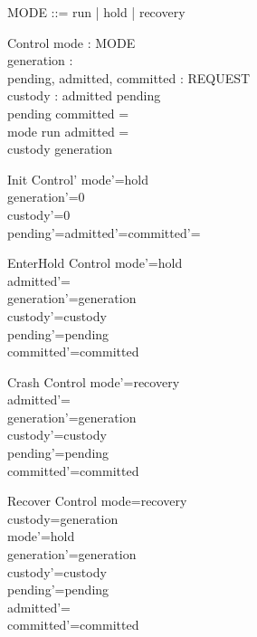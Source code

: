 \documentclass{article}
\begin{document}
\begin{zed}
MODE ::= run | hold | recovery\\
[REQUEST]
\end{zed}
\begin{schema}{Control}
mode : MODE\\
generation : \nat\\
pending, admitted, committed : \power REQUEST\\
custody : \nat
\where
admitted \subseteq pending\\
pending \cap committed = \emptyset\\
mode \neq run \implies admitted = \emptyset\\
custody \leq generation
\end{schema}
\begin{schema}{Init}
Control'
\where
mode'=hold\\
generation'=0\\
custody'=0\\
pending'=admitted'=committed'=\emptyset
\end{schema}
\begin{schema}{EnterHold}
\Delta Control
\where
mode'=hold\\
admitted'=\emptyset\\
generation'=generation\\
custody'=custody\\
pending'=pending\\
committed'=committed
\end{schema}
\begin{schema}{Crash}
\Delta Control
\where
mode'=recovery\\
admitted'=\emptyset\\
generation'=generation\\
custody'=custody\\
pending'=pending\\
committed'=committed
\end{schema}
\begin{schema}{Recover}
\Delta Control
\where
mode=recovery\\
custody=generation\\
mode'=hold\\
generation'=generation\\
custody'=custody\\
pending'=pending\\
admitted'=\emptyset\\
committed'=committed
\end{schema}
\end{document}
